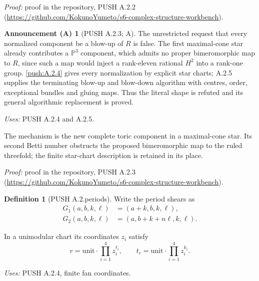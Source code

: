 \documentclass[11pt,a4paper]{article}
\theoremstyle{plain}
\theoremstyle{definition}
\newtheorem{announcement}[theorem]{Announcement (A)}
\newtheorem{definition}[theorem]{Definition}
\begin{document}
\noindent\emph{Proof:} proof in the repository, PUSH A.2.2 (\url{https://github.com/KokunoYumeto/s6-complex-structure-workbench}).

\begin{announcement}[PUSH A.2.3; A]\label{push:A.2.3}
The unrestricted request that every normalized component
be a blow-up of $R$ is false. The first maximal-cone
star already contributes a $\mathbb P^3$ component,
which admits no proper bimeromorphic map to $R$, since
such a map would inject a rank-eleven rational $H^2$
into a rank-one group. \ref{push:A.2.4} gives every normalization
by explicit star charts; A.2.5 supplies the terminating
blow-up and blow-down algorithm with centres, order,
exceptional bundles and gluing maps. Thus the literal
shape is refuted and its general algorithmic
replacement is proved.
\end{announcement}
\noindent\emph{Uses:} PUSH A.2.4 and A.2.5.\par

The mechanism is the new complete toric component in a maximal-cone star. Its second Betti number obstructs the proposed bimeromorphic map to the ruled threefold; the finite star-chart description is retained in its place.

\noindent\emph{Proof:} proof in the repository, PUSH A.2.3 (\url{https://github.com/KokunoYumeto/s6-complex-structure-workbench}).

\begin{definition}[PUSH A.2.periods]\label{push:A.2.periods}
Write the period shears as
\begin{align*}
 G_1(a,b,k,\ell)&=(a+k,b,k,\ell),\\
 G_2(a,b,k,\ell)&=(a,b+k+n\ell,k,\ell).
\end{align*}

In a unimodular chart its
coordinates $z_i$ satisfy
\[
 r=\text{unit}\cdot\prod_{i=1}^4 z_i^{\ell_i},
 \qquad t_c=\text{unit}\cdot\prod_{i=1}^4 z_i^{k_i}.
 \tag{A.24d}
\]
\end{definition}
\noindent\emph{Uses:} PUSH A.2.4, finite fan coordinates.\par
\end{document}
